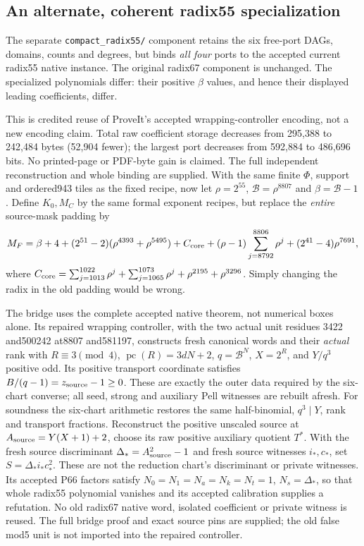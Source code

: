 \subsection{An alternate, coherent radix55 specialization}
The separate \texttt{compact\_radix55/} component retains the six free-port
DAGs, domains, counts and degrees, but binds \emph{all four} ports to the
accepted current radix55 native instance. The original radix67 component
is unchanged. The specialized polynomials differ: their positive $\beta$
values, and hence their displayed leading coefficients, differ.

This is credited reuse of ProveIt's accepted wrapping-controller encoding,
not a new encoding claim. Total raw coefficient storage decreases from
295,388 to 242,484 bytes (52,904 fewer); the largest port decreases from
592,884 to 486,696 bits. No printed-page or PDF-byte gain is claimed.
The full independent reconstruction and whole binding are supplied.
With the same finite $\Phi$, support and ordered943 tiles as the fixed
recipe, now let $\rho=2^{55}$, $\mathcal B=\rho^{8807}$ and
$\beta=\mathcal B-1$. Define $K_0,M_C$ by the same formal exponent
recipes, but replace the \emph{entire} source-mask padding by
\[
 M_F=\beta+4+(2^{51}-2)(\rho^{4393}+\rho^{5495})+C_{\rm core}
 +(\rho-1)\sum_{j=8792}^{8806}\rho^j+(2^{41}-4)\rho^{7691},
\]
where $C_{\rm core}=\sum_{j=1013}^{1022}\rho^j+
\sum_{j=1065}^{1073}\rho^j+\rho^{2195}+\rho^{3296}$.
Simply changing the radix in the old padding would be wrong.

The bridge uses the complete accepted native theorem, not numerical boxes
alone. Its repaired wrapping controller, with the two actual unit residues
3422 and500242 at8807 and581197, constructs fresh canonical words and their
\emph{actual} rank with $R\equiv3\pmod4$, $\operatorname{pc}(R)=3dN+2$,
$q=\mathcal B^N$, $X=2^R$, and $Y/q^3$ positive odd.
Its positive transport coordinate satisfies $B/(q-1)=z_{\rm source}-1\ge0$.
These are exactly the outer data required by the six-chart converse;
all seed, strong and auxiliary Pell witnesses are rebuilt afresh.
For soundness the six-chart arithmetic restores the same half-binomial,
$q^3\mid Y$, rank and transport fractions. Reconstruct the positive
unscaled source at $A_{\rm source}=Y(X+1)+2$, choose its raw positive
auxiliary quotient $T^*$. With the fresh source discriminant
$\Delta_*=A_{\rm source}^2-1$ and fresh source witnesses $i_*,c_*$,
set $S=\Delta_* i_*c_*^2$. These are not the reduction chart's discriminant or private witnesses.
Its accepted P66 factors satisfy
$N_0=N_1=N_a=N_k=N_t=1$, $N_s=\Delta_*$, so that whole radix55
polynomial vanishes and its accepted calibration supplies a refutation.
No old radix67 native word, isolated coefficient or private witness is reused.
The full bridge proof and exact source pins are supplied; the old false
mod5 unit is not imported into the repaired controller.
